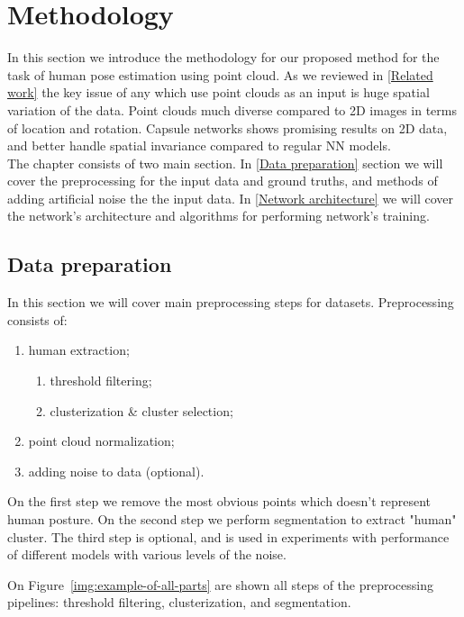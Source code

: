 \chapter{Methodology}
\label{Methodology}

In this section we introduce the methodology for our proposed method for the task of human pose estimation using point cloud. As we reviewed in \ref{Related work} the key issue of any which use point clouds as an input is huge spatial variation of the data. Point clouds much diverse compared to 2D images in terms of location and rotation. Capsule networks shows promising results \parencite{sabour_dynamic_2017} on 2D data, and better handle spatial invariance compared to regular NN models.  \\
The chapter consists of two main section. In \ref{Data preparation} section we will cover the preprocessing for the input data and ground truths, and methods of adding artificial noise the the input data. In \ref{Network architecture} we will cover the network's architecture and algorithms for performing network's training.


\section{Data preparation}
\label{Data-preparation}
In this section we will cover main preprocessing steps for datasets. Preprocessing consists of:
\begin{enumerate}
  \item human extraction;
  \begin{enumerate}
    \item threshold filtering;
    \item clusterization \& cluster selection;
  \end{enumerate}
  \item point cloud normalization;
  \item adding noise to data (optional).
\end{enumerate}

On the first step we remove the most obvious points which doesn't represent human posture. On the second step we perform segmentation to extract "human" cluster. The third step is optional, and is used in experiments with performance of different models with various levels of the noise.  

On Figure~\ref{img:example-of-all-parts} are shown all steps of the preprocessing pipelines: threshold filtering, clusterization, and segmentation.

